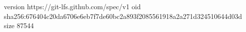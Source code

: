 version https://git-lfs.github.com/spec/v1
oid sha256:676404c20da6706e6eb7f7de60bc2a893f2085561918a2a271d324510644d03d
size 87544
